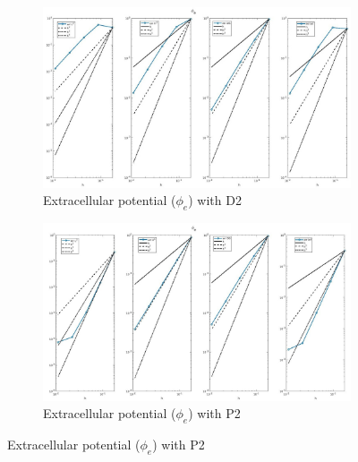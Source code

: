 \documentclass[a4paper,11pt]{article}
\begin{document}
\begin{figure}[H]
\caption{Comparison of the extracellular potential ($\phi_e$)}
\label{phie_2}
\begin{subfigure}{\textwidth}
\begin{center}
\includegraphics[width = \textwidth]{./D2_Phie_1.jpg}
\caption{Extracellular potential ($\phi_e$) with D2}
\end{center}
\end{subfigure}
\begin{subfigure}{\textwidth}
\begin{center}
\includegraphics[width =\textwidth]{./P2_Phie_1.jpg}
\caption{Extracellular potential ($\phi_e$) with P2}
\end{center}
\end{subfigure}
\end{figure}
\newpage
\end{document}
